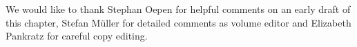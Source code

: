 \documentclass[output=paper
 	        ,biblatex
                ,babelshorthands
                ,newtxmath
                ,draftmode
                ,colorlinks, citecolor=brown
]{langscibook}
\begin{document}


\section*{\acknowledgmentsUS}

We would like to thank Stephan Oepen for helpful comments on an early
draft of this chapter, Stefan Müller for detailed comments as
volume editor and Elizabeth Pankratz for careful copy editing.

{\sloppy
\printbibliography[heading=subbibliography,notkeyword=this] 
}
\end{document}

